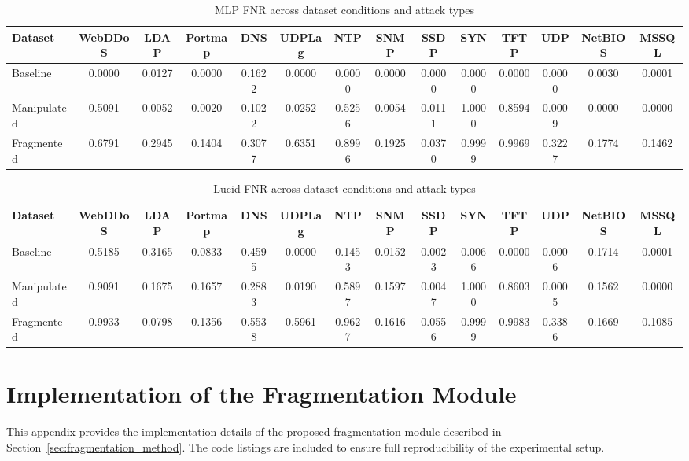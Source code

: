 \begin{table}[htbp]
\centering
\scriptsize
\setlength{\tabcolsep}{3pt}
\begin{tabular}{l|ccccccccccccc}
\hline
Dataset &
WebDDoS &
LDAP &
Portmap &
DNS &
UDPLag &
NTP &
SNMP &
SSDP &
SYN &
TFTP &
UDP &
NetBIOS &
MSSQL \\
\hline
Baseline &
0.0000 & 0.0127 & 0.0000 & 0.1622 & 0.0000 & 0.0000 & 0.0000 & 0.0000 & 0.0000 & 0.0000 & 0.0000 & 0.0030 & 0.0001 \\
\hline
Manipulated &
0.5091 & 0.0052 & 0.0020 & 0.1022 & 0.0252 & 0.5256 & 0.0054 & 0.0111 & 1.0000 & 0.8594 & 0.0009 & 0.0000 & 0.0000 \\
\hline
Fragmented &
0.6791 & 0.2945 & 0.1404 & 0.3077 & 0.6351 & 0.8996 & 0.1925 & 0.0370 & 0.9999 & 0.9969 & 0.3227 & 0.1774 & 0.1462 \\
\hline
\end{tabular}
\caption{MLP FNR across dataset conditions and attack types}
\label{tab:mlp_fnr}
\end{table}

\begin{table}[htbp]
\centering
\scriptsize
\setlength{\tabcolsep}{3pt}
\begin{tabular}{l|ccccccccccccc}
\hline
Dataset &
WebDDoS &
LDAP &
Portmap &
DNS &
UDPLag &
NTP &
SNMP &
SSDP &
SYN &
TFTP &
UDP &
NetBIOS &
MSSQL \\
\hline
Baseline &
0.5185 & 0.3165 & 0.0833 & 0.4595 & 0.0000 & 0.1453 & 0.0152 & 0.0023 & 0.0066 & 0.0000 & 0.0006 & 0.1714 & 0.0001 \\
\hline
Manipulated &
0.9091 & 0.1675 & 0.1657 & 0.2883 & 0.0190 & 0.5897 & 0.1597 & 0.0047 & 1.0000 & 0.8603 & 0.0005 & 0.1562 & 0.0000 \\
\hline
Fragmented &
0.9933 & 0.0798 & 0.1356 & 0.5538 & 0.5961 & 0.9627 & 0.1616 & 0.0556 & 0.9999 & 0.9983 & 0.3386 & 0.1669 & 0.1085 \\
\hline
\end{tabular}
\caption{Lucid FNR across dataset conditions and attack types}
\label{tab:lucid_fnr}
\end{table}


\chapter{Implementation of the Fragmentation Module}
\label{appendix:fragmentation_code}

This appendix provides the implementation details of the proposed fragmentation module described in Section~\ref{sec:fragmentation_method}.  
The code listings are included to ensure full reproducibility of the experimental setup.

